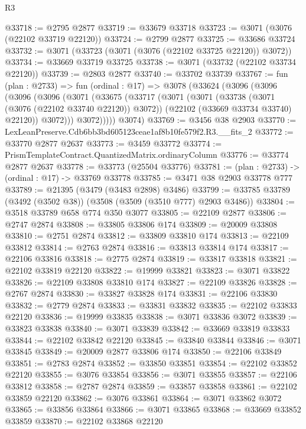\begin{lexlean}{R3}
\begin{coremodule}
@33718 := @2795 @2877
@33719 := @33679 @33718
@33723 := @3071 (@3076 (@22102 @33719 @22120))
@33724 := @2799 @2877
@33725 := @33686 @33724
@33732 := @3071 (@33723 (@3071 (@3076 (@22102 @33725 @22120)) @3072))
@33734 := @33669 @33719 @33725
@33738 := @3071 (@33732 (@22102 @33734 @22120))
@33739 := @2803 @2877
@33740 := @33702 @33739
@33767 := fun (plan : @2733) =>
  fun (ordinal : @17) =>
  @3078
    (@33624
      (@3096
        (@3096
          (@3096
            (@3096
              (@3071
                (@33675
                  (@33717
                    (@3071
                      (@3071
                        (@33738 (@3071 (@3076 (@22102 @33740 @22120)) @3072))
                        (@22102 (@33669 @33734 @33740) @22120))
                      @3072)))
                @3072)))))
      @3074)
@33769 := @3456 @38 @2903
@33770 := LexLeanPreserve.Cdb6bb3bd605123ceae1af8b10fe579f2.R3.__fits_2
@33772 := @33770 @2877 @2637
@33773 := @3459 @33772
@33774 := PrismTemplateContract.QuantizedMatrix.ordinaryColumn
@33776 := @33774 @2877 @2637
@33778 := @33773 (@25504 @33776)
@33781 := (plan : @2733) -> (ordinal : @17) -> @33769 @33778
@33785 := @3471 @38 @2903 @33778 @777
@33789 := @21395 (@3479 (@3483 @2898) @3486)
@33799 := @33785 @33789 (@3492 (@3502 @38)) (@3508 (@3509 (@3510 @777) @2903 @3486))
@33804 := @3518 @33789 @658 @774 @350 @3077
@33805 := @22109 @2877
@33806 := @2747 @2874
@33808 := @33805 @33806 @174
@33809 := @20009 @33808
@33810 := @2751 @2874
@33812 := @33809 @33810 @174
@33813 := @22109 @33812
@33814 := @2763 @2874
@33816 := @33813 @33814 @174
@33817 := @22106 @33816
@33818 := @2775 @2874
@33819 := @33817 @33818
@33821 := @22102 @33819 @22120
@33822 := @19999 @33821
@33823 := @3071 @33822
@33826 := @22109 @33808 @33810 @174
@33827 := @22109 @33826
@33828 := @2767 @2874
@33830 := @33827 @33828 @174
@33831 := @22106 @33830
@33832 := @2779 @2874
@33833 := @33831 @33832
@33835 := @22102 @33833 @22120
@33836 := @19999 @33835
@33838 := @3071 @33836 @3072
@33839 := @33823 @33838
@33840 := @3071 @33839
@33842 := @33669 @33819 @33833
@33844 := @22102 @33842 @22120
@33845 := @33840 @33844
@33846 := @3071 @33845
@33849 := @20009 @2877 @33806 @174
@33850 := @22106 @33849
@33851 := @2783 @2874
@33852 := @33850 @33851
@33854 := @22102 @33852 @22120
@33855 := @3076 @33854
@33856 := @3071 @33855
@33857 := @22106 @33812
@33858 := @2787 @2874
@33859 := @33857 @33858
@33861 := @22102 @33859 @22120
@33862 := @3076 @33861
@33864 := @3071 @33862 @3072
@33865 := @33856 @33864
@33866 := @3071 @33865
@33868 := @33669 @33852 @33859
@33870 := @22102 @33868 @22120

\end{coremodule}
\end{lexlean}

